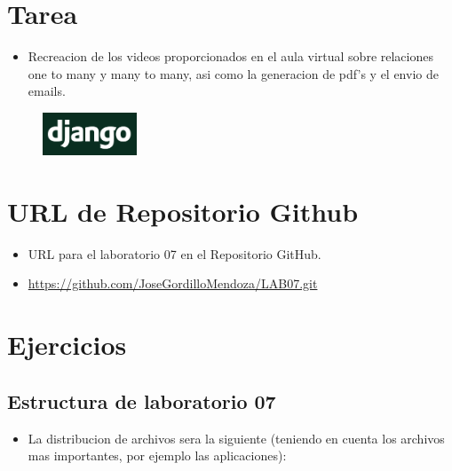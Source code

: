 \documentclass{article}
\begin{document}
	\section{Tarea}
	\begin{itemize}		
		\item Recreacion de los videos proporcionados en el aula virtual sobre relaciones one to many y many to many, asi como la generacion de pdf's y el envio de emails.
	\end{itemize}
        \begin{figure}[H]
		\centering
		\includegraphics[width=0.25\textwidth,keepaspectratio]{img/django.png}
	\end{figure}

	\section{URL de Repositorio Github}
	\begin{itemize}
		\item URL para el laboratorio 07 en el Repositorio GitHub.
		\item \url{https://github.com/JoseGordilloMendoza/LAB07.git}
	\end{itemize}
	
	\section{Ejercicios}
 
        \subsection{Estructura de laboratorio 07}
	\begin{itemize}	
		\item La distribucion de archivos sera la siguiente (teniendo en cuenta los archivos mas importantes, por ejemplo las aplicaciones):
	\end{itemize}
	
\end{document}
